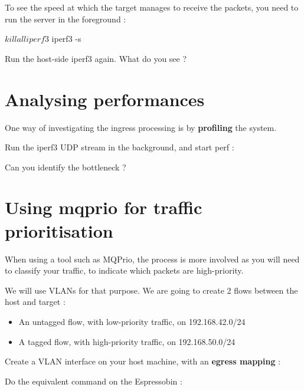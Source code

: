 To see the speed at which the target manages to receive the packets, you need to
run the  server in the foreground :

\begin{targetbashinput}
$ killall iperf3
$ iperf3 -s
\end{targetbashinput}

Run the host-side iperf3 again. What do you see ?

\section{Analysing performances}

One way of investigating the ingress processing is by \textbf{profiling} the system.

Run the iperf3 UDP stream in the background, and start perf :


Can you identify the bottleneck ?

\section{Using mqprio for traffic prioritisation}

When using a tool such as MQPrio, the process is more involved as you will need
to classify your traffic, to indicate which packets are high-priority.

We will use VLANs for that purpose. We are going to create 2 flows between the
host and target :
\begin{itemize}
	\item An untagged flow, with low-priority traffic, on 192.168.42.0/24
	\item A tagged flow, with high-priority traffic, on 192.168.50.0/24
\end{itemize}

Create a VLAN interface on your host machine, with an \textbf{egress mapping} :


Do the equivalent command on the Espressobin :

